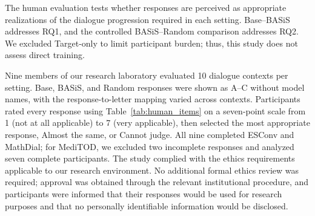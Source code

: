 \documentclass[manuscript,review,anonymous]{acmart}
\begin{document}
The human evaluation tests whether responses are perceived as appropriate realizations of the dialogue progression required in each setting. Base--BASiS addresses RQ1, and the controlled BASiS--Random comparison addresses RQ2. We excluded Target-only to limit participant burden; thus, this study does not assess direct training.

Nine members of our research laboratory evaluated 10 dialogue contexts per setting. Base, BASiS, and Random responses were shown as A--C without model names, with the response-to-letter mapping varied across contexts. Participants rated every response using Table~\ref{tab:human_items} on a seven-point scale from 1 (not at all applicable) to 7 (very applicable), then selected the most appropriate response, Almost the same, or Cannot judge. All nine completed ESConv and MathDial; for MediTOD, we excluded two incomplete responses and analyzed seven complete participants. The study complied with the ethics requirements applicable to our research environment. No additional formal ethics review was required; approval was obtained through the relevant institutional procedure, and participants were informed that their responses would be used for research purposes and that no personally identifiable information would be disclosed.
\end{document}
